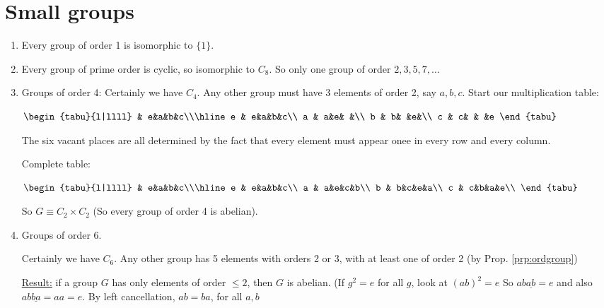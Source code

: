 \documentclass{article}
\theoremstyle{definition}
\begin{document}
\section{Small groups}
\begin{enumerate}
  \item 
  Every group of order 1 is isomorphic to $\{1\}$.
\item Every group of prime order is cyclic, so isomorphic to $C_8$. So only one group of order $2,3,5,7,\ldots$

\item Groups of order 4: Certainly we have $C_4$. Any other group must have 3 elements of order 2, say $a,b,c$. Start our multiplication table:

  \begin{table}[h]
    \centering
    $\begin{tabu}{l|llll}
    & e&a&b&c\\\hline
  e & e&a&b&c\\
  a & a&e& &\\
  b & b& &e&\\
  c & c& & &e 
    \end{tabu}$
    \label{tab:startedtable}
  \end{table}

The six vacant places are all determined by the fact that every element must appear onee in every row and every column.

Complete table:
\begin{table}[h]
  \centering
  $\begin{tabu}{l|llll}
     & e&a&b&c\\\hline
   e & e&a&b&c\\
   a & a&e&c&b\\
   b & b&c&e&a\\
   c & c&b&a&e\\
  \end{tabu}$
  \label{tab:completesimpletable}
\end{table}

So $G \equiv C_2 \times C_2$ (So every group of order 4 is abelian).

\item Groups of order 6.

  Certainly we have $C_6$. Any other group has 5 elements with orders 2 or 3, with at least one of order 2 (by Prop. \ref{prp:ordgroup})

  \underline{Result:} if a group $G$ has only elements of order $\leq 2$, then $G$ is abelian. (If $g^2 = e$ for all $g$, look at $(ab)^2 = e$ So $ab\underline{ab}=e$ and also $ab\underline{ba}=aa=e$. By left cancellation, $ab=ba$, for all $a,b$


\end{enumerate}
\end{document}
